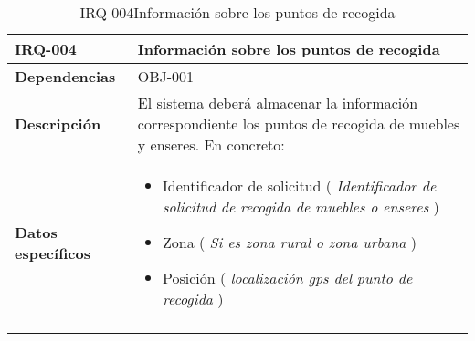 \begin{center}
\begin{longtable}{|p{80pt}|p{9cm}|}
\hline
\textbf{IRQ-004} & Información sobre los puntos de recogida \\ \hline
\textbf{Dependencias} & OBJ-001 \\ \hline
\textbf{Descripción} & El sistema deberá almacenar la información correspondiente los puntos de recogida de muebles y enseres. En concreto: \\ \hline
\textbf{Datos \mbox{específicos}} & 
\begin{itemize}
    \item Identificador de solicitud ( \textit{Identificador de solicitud de recogida de muebles o enseres} )
    \item Zona ( \textit{Si es zona rural o zona urbana} )
    \item Posición ( \textit{localización gps del punto de recogida} )
\end{itemize}\\ \hline
\caption{IRQ-004Información sobre los puntos de recogida}
\end{longtable}
\end{center}